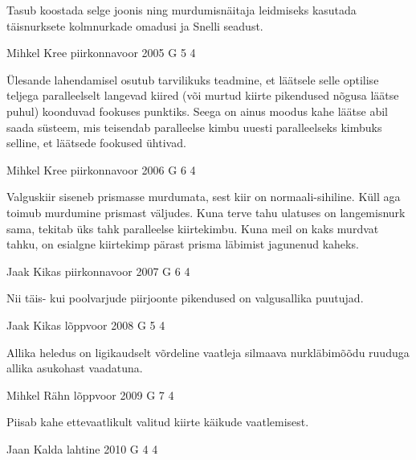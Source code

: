 \documentclass[11pt]{article}
\begin{document}
{{\ifHint
Tasub koostada selge joonis ning murdumisnäitaja leidmiseks kasutada täisnurksete kolmnurkade omadusi ja Snelli seadust.
\fi
}

{Mihkel Kree} %
{piirkonnavoor} %
{2005} %
{G 5} %
{4} %
{

\ifHint
Ülesande lahendamisel osutub tarvilikuks teadmine, et läätsele selle optilise teljega paralleelselt langevad kiired (või murtud kiirte pikendused nõgusa läätse puhul) koonduvad fookuses punktiks. Seega on ainus moodus kahe läätse abil saada süsteem, mis teisendab paralleelse kimbu uuesti paralleelseks kimbuks selline, et läätsede fookused ühtivad. 
\fi
}

{Mihkel Kree} %
{piirkonnavoor} %
{2006} %
{G 6} %
{4} %
{

\ifHint
Valguskiir siseneb prismasse murdumata, sest kiir on normaali-sihiline. Küll aga toimub murdumine prismast väljudes. Kuna terve tahu ulatuses on langemisnurk sama, tekitab üks tahk paralleelse kiirtekimbu. Kuna meil on kaks murdvat tahku, on esialgne kiirtekimp pärast prisma läbimist jagunenud kaheks.
\fi
}

{Jaak Kikas} %
{piirkonnavoor} %
{2007} %
{G 6} %
{4} %
{

\ifHint
Nii täis- kui poolvarjude piirjoonte pikendused on valgusallika puutujad.
\fi
}

{Jaak Kikas} %
{lõppvoor} %
{2008} %
{G 5} %
{4} %
{

\ifHint
Allika heledus on ligikaudselt võrdeline vaatleja silmaava nurkläbimõõdu ruuduga allika asukohast vaadatuna.
\fi
}

{Mihkel Rähn} %
{lõppvoor} %
{2009} %
{G 7} %
{4} %
{

\ifHint
Piisab kahe ettevaatlikult valitud kiirte käikude vaatlemisest.
\fi
}

{Jaan Kalda} %
{lahtine} %
{2010} %
{G 4} %
{4} %
{

}}
\end{document}
